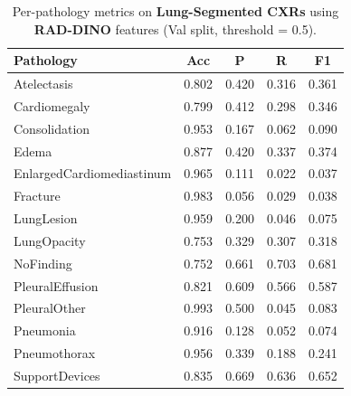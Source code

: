 \begin{table}[H]
\centering
\small
\begin{tabular}{lcccc}
\toprule
\textbf{Pathology} & \textbf{Acc} & \textbf{P} & \textbf{R} & \textbf{F1} \\
\midrule
Atelectasis               & 0.802 & 0.420 & 0.316 & 0.361 \\
Cardiomegaly              & 0.799 & 0.412 & 0.298 & 0.346 \\
Consolidation             & 0.953 & 0.167 & 0.062 & 0.090 \\
Edema                     & 0.877 & 0.420 & 0.337 & 0.374 \\
EnlargedCardiomediastinum & 0.965 & 0.111 & 0.022 & 0.037 \\
Fracture                  & 0.983 & 0.056 & 0.029 & 0.038 \\
LungLesion                & 0.959 & 0.200 & 0.046 & 0.075 \\
LungOpacity               & 0.753 & 0.329 & 0.307 & 0.318 \\
NoFinding                 & 0.752 & 0.661 & 0.703 & 0.681 \\
PleuralEffusion           & 0.821 & 0.609 & 0.566 & 0.587 \\
PleuralOther              & 0.993 & 0.500 & 0.045 & 0.083 \\
Pneumonia                 & 0.916 & 0.128 & 0.052 & 0.074 \\
Pneumothorax              & 0.956 & 0.339 & 0.188 & 0.241 \\
SupportDevices            & 0.835 & 0.669 & 0.636 & 0.652 \\
\bottomrule
\end{tabular}
\caption{Per-pathology metrics on \textbf{Lung-Segmented CXRs} using \textbf{RAD-DINO} features (Val split, threshold = 0.5).}
\label{tab:seg_dino}
\end{table}
